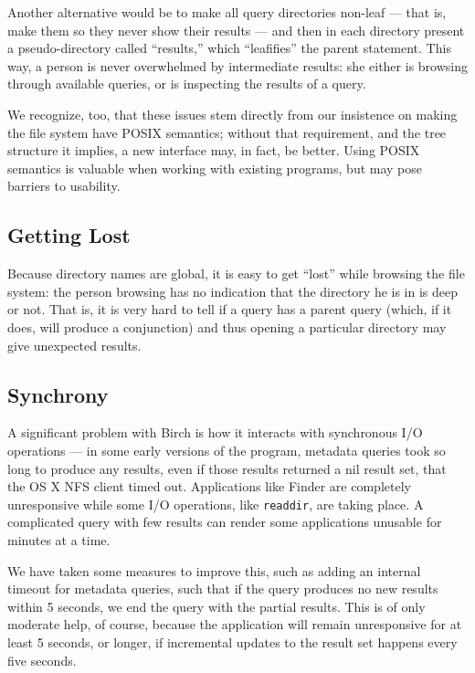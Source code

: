 \documentclass{article}
\begin{document}
Another alternative would be to make all query directories non-leaf
--- that is, make them so they never show their results --- and then
in each directory present a pseudo-directory called ``results,'' which
``leafifies'' the parent statement. This way, a person is never
overwhelmed by intermediate results: she either is browsing through
available queries, or is inspecting the results of a query.

We recognize, too, that these issues stem directly from our insistence
on making the file system have POSIX semantics; without that
requirement, and the tree structure it implies, a new interface may,
in fact, be better. Using POSIX semantics is valuable when working
with existing programs, but may pose barriers to usability.

\subsection{Getting Lost}

Because directory names are global, it is easy to get ``lost'' while
browsing the file system: the person browsing has no indication that
the directory he is in is deep or not. That is, it is very hard to
tell if a query has a parent query (which, if it does, will produce a
conjunction) and thus opening a particular directory may give
unexpected results.

\subsection{Synchrony}

A significant problem with Birch is how it interacts with synchronous
I/O operations --- in some early versions of the program, metadata
queries took so long to produce any results, even if those results
returned a nil result set, that the OS X NFS client timed
out. Applications like Finder are completely unresponsive while some
I/O operations, like \texttt{readdir}, are taking place. A complicated
query with few results can render some applications unusable for
minutes at a time.

We have taken some measures to improve this, such as adding an
internal timeout for metadata queries, such that if the query produces
no new results within 5 seconds, we end the query with the partial
results. This is of only moderate help, of course, because the
application will remain unresponsive for at least 5 seconds, or
longer, if incremental updates to the result set happens every five
seconds.
\end{document}
